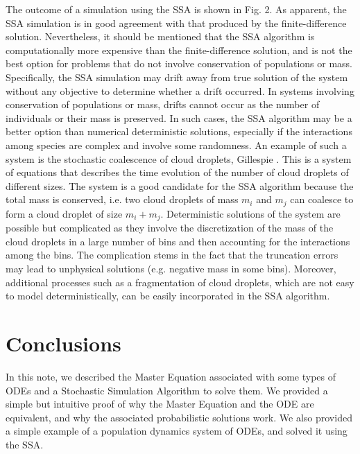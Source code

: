 \documentclass[12pt]{article}
\begin{document}
The outcome of a simulation using the SSA is shown in Fig. 2. As apparent, the SSA simulation is in good agreement with that produced by the finite-difference solution. Nevertheless, it should be mentioned that the SSA algorithm is computationally more expensive than the finite-difference solution, and is not the best option for problems that do not involve conservation of populations or mass. Specifically, the SSA simulation may drift away from true solution of the system without any objective to determine whether a drift occurred. In systems involving conservation of populations or mass, drifts cannot occur as the number of individuals or their mass is preserved.  In such cases, the SSA algorithm may be a better option than numerical deterministic solutions, especially if the interactions among species are complex and involve some randomness. An example of such a system is the stochastic coalescence of cloud droplets, Gillespie \cite{Gillespie1975}. This is a system of equations that describes the time evolution of the number of cloud droplets of different sizes. The system is a good candidate for the SSA algorithm because the total mass is conserved, i.e. two cloud droplets of mass $m_i$ and $m_j$ can coalesce to form a cloud droplet of size $m_i+m_j$. Deterministic solutions of the system are possible but complicated as they involve the discretization of the mass of the cloud droplets in a large number of bins and then accounting for the interactions among the bins.  The complication stems in the fact that the truncation errors may lead to unphysical solutions (e.g. negative mass in some bins). Moreover, additional processes such as a fragmentation of cloud droplets, which are not easy to model deterministically, can be easily incorporated in the SSA algorithm.

\section{Conclusions}
In this note, we described the Master Equation associated with some types of ODEs and a Stochastic Simulation Algorithm to solve them. We provided a simple but intuitive proof of why the Master Equation and the ODE are equivalent, and why the associated probabilistic solutions work. We also provided a simple example of a population dynamics system of ODEs, and solved it using the SSA.
\end{document}
